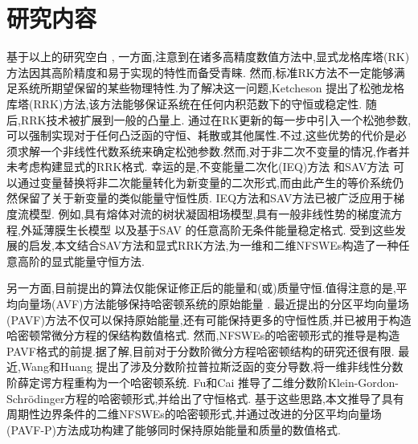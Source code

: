 \section{研究内容}
基于以上的研究空白 , 
一方面,注意到在诸多高精度数值方法中,显式龙格库塔(RK)方法因其高阶精度和易于实现的特性而备受青睐.
然而,标准RK方法不一定能够满足系统所期望保留的某些物理特性.为了解决这一问题,Ketcheson \cite{ketchesonRelaxationRungeKutta2019} 提出了松弛龙格库塔(RRK)方法,该方法能够保证系统在任何内积范数下的守恒或稳定性.
随后,RRK技术被扩展到一般的凸量上\cite{ranochaRelaxationRungeKutta2020}.
通过在RK更新的每一步中引入一个松弛参数,可以强制实现对于任何凸泛函的守恒、耗散或其他属性.不过,这些优势的代价是必须求解一个非线性代数系统来确定松弛参数.然而,对于非二次不变量的情况,作者并未考虑构建显式的RRK格式.
幸运的是,不变能量二次化(IEQ)方法 \cite{yangLinearUnconditionallyEnergy2017,yangEfficientLinearSchemes2017} 和SAV方法 \cite{chengConvergenceEnergyconservingScheme2022} 可以通过变量替换将非二次能量转化为新变量的二次形式,而由此产生的等价系统仍然保留了关于新变量的类似能量守恒性质.
IEQ方法和SAV方法已被广泛应用于梯度流模型\cite{zhaoNumericalApproximationsPhase2017,shenScalarAuxiliaryVariable2018,liuExponentialScalarAuxiliary2020,chengMultipleScalarAuxiliary2018}.
例如,具有熔体对流的树状凝固相场模型\cite{chenEfficientNumericalScheme2019},具有一般非线性势的梯度流方程\cite{yangConvergenceAnalysisInvariant2020},外延薄膜生长模型\cite{chengHighlyEfficientAccurate2019}
以及基于SAV 的任意高阶无条件能量稳定格式\cite{gongArbitrarilyHighorderUnconditionally2020}.
受到这些发展的启发,本文结合SAV方法和显式RRK方法,为一维和二维NFSWEs构造了一种任意高阶的显式能量守恒方法.

另一方面,目前提出的算法仅能保证修正后的能量和(或)质量守恒.值得注意的是,平均向量场(AVF)方法\cite{buddGeometricIntegrationUsing1999,quispelNewClassEnergypreserving2008}能够保持哈密顿系统的原始能量 . 
最近提出的分区平均向量场(PAVF)方法\cite{caiPartitionedAveragedVector2018}不仅可以保持原始能量,还有可能保持更多的守恒性质,并已被用于构造哈密顿常微分方程的保结构数值格式.
然而,NFSWEs的哈密顿形式的推导是构造PAVF格式的前提.据了解,目前对于分数阶微分方程哈密顿结构的研究还很有限.
最近,Wang和Huang \cite{wangStructurepreservingNumericalMethods2018} 提出了涉及分数阶拉普拉斯泛函的变分导数,将一维非线性分数阶薛定谔方程重构为一个哈密顿系统.
Fu和Cai \cite{fuStructurepreservingAlgorithmsTwodimensional2020} 推导了二维分数阶Klein-Gordon-Schr{\"o}dinger方程的哈密顿形式,并给出了守恒格式.
基于这些思路,本文推导了具有周期性边界条件的二维NFSWEs的哈密顿形式,并通过改进的分区平均向量场(PAVF-P)方法成功构建了能够同时保持原始能量和质量的数值格式.

